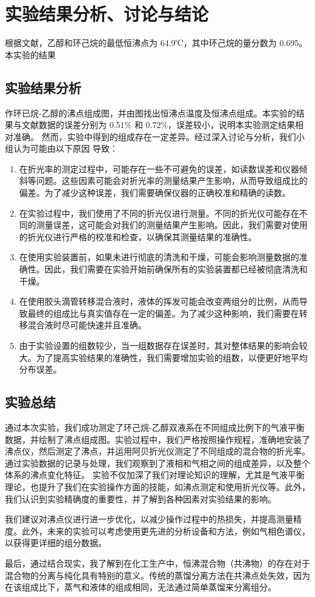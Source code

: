 \documentclass[12pt,hyperref,a4paper,UTF8]{ctexart}
\begin{document}
\section{实验结果分析、讨论与结论}
根据文献\cite{1}，乙醇和环己烷的最低恒沸点为 64.9℃，其中环己烷的量分数为 0.695。本实验的结果
\subsection{实验结果分析}
作环已烷-乙醇的沸点组成图，并由图找出恒沸点温度及恒沸点组成。本实验的结果与文献数据的误差分别为 0.51\% 和 0.72\%，误差较小，说明本实验测定结果相对准确。
然而，实验中得到的组成存在一定差异。经过深入讨论与分析，我们小组认为可能由以下原因
导致：
\begin{enumerate}
    \item  在折光率的测定过程中，可能存在一些不可避免的误差，如读数误差和仪器倾斜等问题。这些因素可能会对折光率的测量结果产生影响，从而导致组成比的偏差。为了减少这种误差，我们需要确保仪器的正确校准和精确的读数。
    \item 在实验过程中，我们使用了不同的折光仪进行测量。不同的折光仪可能存在不同的测量误差，这可能会对我们的测量结果产生影响。因此，我们需要对使用的折光仪进行严格的校准和检查，以确保其测量结果的准确性。
    \item 在使用实验装置前，如果未进行彻底的清洗和干燥，可能会影响测量数据的准确性。因此，我们需要在实验开始前确保所有的实验装置都已经被彻底清洗和干燥。
    \item 在使用胶头滴管转移混合液时，液体的挥发可能会改变两组分的比例，从而导致最终的组成比与真实值存在一定的偏差。为了减少这种影响，我们需要在转移混合液时尽可能快速并且准确。
    \item 由于实验设置的组数较少，当一组数据存在误差时，其对整体结果的影响会较大。为了提高实验结果的准确性，我们需要增加实验的组数，以便更好地平均分布误差。
\end{enumerate}
\subsection{实验总结}
通过本次实验，我们成功测定了环己烷-乙醇双液系在不同组成比例下的气液平衡数据，并绘制了沸点组成图。实验过程中，我们严格按照操作规程，准确地安装了沸点仪，然后测定了沸点，并运用阿贝折光仪测定了不同组成的混合物的折光率。通过实验数据的记录与处理，我们观察到了液相和气相之间的组成差异，以及整个体系的沸点变化特征。
实验不仅加深了我们对理论知识的理解，尤其是气液平衡理论，也提升了我们在实验操作方面的技能，如沸点测定和使用折光仪等。此外，我们认识到实验精确度的重要性，并了解到各种因素对实验结果的影响。

我们建议对沸点仪进行进一步优化，以减少操作过程中的热损失，并提高测量精度。此外，未来的实验可以考虑使用更先进的分析设备和方法，例如气相色谱仪，以获得更详细的组分数据。

最后，通过结合现实，我了解到在化工生产中，恒沸混合物（共沸物）的存在对于混合物的分离与纯化具有特别的意义。传统的蒸馏分离方法在共沸点处失效，因为在该组成比下，蒸气和液体的组成相同，无法通过简单蒸馏来分离组分。
\end{document}
